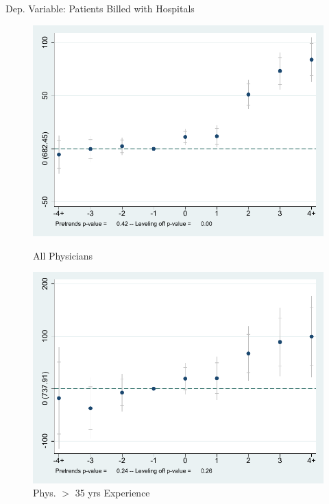 \documentclass[10pt]{beamer}
\begin{document}
\begin{frame}{Dep. Variable: Patients Billed with Hospitals}
\begin{figure}[ht]
        \begin{minipage}[b]{0.47\linewidth}
            \centering
            \includegraphics[width=\textwidth]{Objects/xtevent_fullsample.pdf}
            \caption{\small All Physicians\\}
        \end{minipage}
        \hspace{0.2cm}
        \begin{minipage}[b]{0.47\linewidth}
            \centering
            \includegraphics[width=\textwidth]{Objects/xtevent_oldsample.pdf}
            \caption{\small Phys. $>$ 35 yrs Experience}
        \end{minipage}
    \end{figure}
\end{frame}
\end{document}
